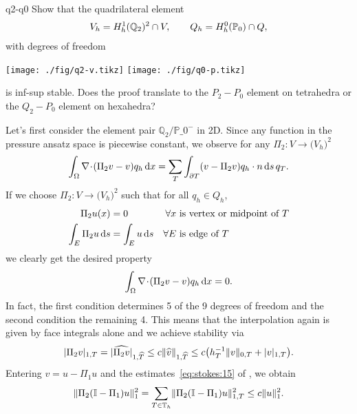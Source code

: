 \begin{Problem}{q2-q0}
  Show that the quadrilateral element
  \begin{gather}
    V_h = H^1_h(\mathbb Q_2)^2\cap V,
    \qquad Q_h = H^0_h(\mathbb P_0) \cap Q,
  \end{gather}
  with degrees of freedom
  \begin{center}
    \texttt{[image: ./fig/q2-v.tikz]}
    \hspace{1cm}
    \texttt{[image: ./fig/q0-p.tikz]}
  \end{center}
  is inf-sup stable. Does the proof translate to the $P_2-P_0$ element
  on tetrahedra or the $Q_2-P_0$ element on hexahedra?
\begin{solution}
  Let's first consider the element pair $\mathbb{Q}_2/\mathbb{P}\_0^-$ in 2D.
  Since any function in the pressure ansatz space is piecewise constant, we observe
  for any $\Pi_2: V \to \bigl(V_h\bigr)^2$
  \begin{align*}
    \int_\Omega \nabla\!\cdot\!(\Pi_2 v-v) q_h \,\mathrm{d} x
    = \sum_T\int_{\partial T} (v-\Pi_2v)q_h \cdot n \,\mathrm{d} s \,q_T.
  \end{align*}
  If we choose $\Pi_2: V \to \bigl(V_h\bigr)^2$ such that for all $q_h\in Q_h$,
  \begin{align*}
    \Pi_2 u(x) &= 0
    & \forall x &\text{ is vertex or midpoint of } T\\
    \int_E \Pi_2 u\,\mathrm{d} s &= \int_E u\,\mathrm{d} s
    & \forall E &\text{ is edge of } T
  \end{align*}
  we clearly get the desired property
  \begin{align*}
    \int_\Omega \nabla\!\cdot\!(\Pi_2 v-v) q_h \,\mathrm{d} x = 0.
  \end{align*}
  In fact, the first condition determines 5 of the 9 degrees of freedom
  and the second condition the remaining 4. This means that the interpolation
  again is given by face integrals alone and we achieve stability via
  \begin{align*}
    \lvert\Pi_2 v\rvert_{1,T}
    =\lvert\widehat{\Pi_2 v}\rvert_{1,\widehat{T}}
    \le c \lVert\widehat v\rVert_{1,\widehat{T}}
    \le c \bigl(h_T^{-1} \lVert v\rVert_{0,T} + \lvert v\rvert_{1,T}\bigr).
  \end{align*}
  Entering $v=u-\Pi_1 u$ and the estimates~\eqref{eq:stokes:15} of
  , we obtain
  \begin{align*}
    \lVert\Pi_2 (\mathbb I-\Pi_1)u\rVert_1^2
    = \sum_{T\in\mathbb T_h}\lVert\Pi_2
      (\mathbb I-\Pi_1)u\rVert_{1,T}^2
    \le c \lVert u\rVert_1^2.
  \end{align*}


\end{solution}
\end{Problem}
